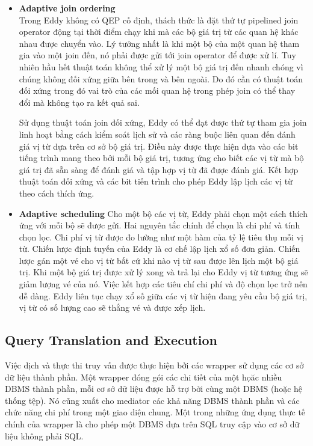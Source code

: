 \documentclass[a4paper]{article}
\begin{document}
\begin{itemize}
    \item \textbf{Adaptive join ordering}\\
    Trong Eddy không có QEP cố định, thách thức là đặt thứ tự pipelined join operator động tại thời điểm chạy khi mà các bộ giá trị từ các quan hệ khác nhau được chuyển vào. Lý tưởng nhất là khi một bộ của một quan hệ tham gia vào một join đến, nó phải được gửi tới join operator để được xử lí. Tuy nhiên hầu hết thuật toán không thể xử lý một bộ giá trị đến nhanh chóng vì chúng không đối xứng giữa bên trong và bên ngoài. Do đó cần có thuật toán đối xứng trong đó vai trò của các mối quan hệ trong phép join có thể thay đổi mà không tạo ra kết quả sai.


    Sử dụng thuật toán join đối xứng, Eddy có thể đạt được thứ tự tham gia join linh hoạt bằng cách kiểm soát lịch sử và các ràng buộc liên quan đến đánh giá vị từ dựa trên cơ sở bộ giá trị. Điều này được thực hiện dựa vào các bit tiếng trình mang theo bởi mỗi bộ giá trị, tương ứng cho biết các vị từ mà bộ giá trị đã sẵn sàng để đánh giá và tập hợp vị từ đã được đánh giá. Kết hợp thuật toán đối xứng và các bit tiến trình cho phép Eddy lập lịch các vị từ theo cách thích ứng.
    \item \textbf{Adaptive scheduling}
    Cho một bộ các vị từ, Eddy phải chọn một cách thích ứng với mỗi bộ sẽ được gửi. Hai nguyên tắc chính để chọn là chi phí và tính chọn lọc. Chi phí vị từ được đo lường như một hàm của tỷ lệ tiêu thụ mỗi vị từ. Chiến lược định tuyến của Eddy là cơ chế lập lịch xổ số đơn giản. Chiến lược gán một vé cho vị từ bất cứ khi nào vị từ sau được lên lịch một bộ giá trị. Khi một bộ giá trị được xử lý xong và trả lại cho Eddy vị từ tương ứng sẽ giảm lượng vé của nó. Việc kết hợp các tiêu chí chi phí và độ chọn lọc trở nên dễ dàng. Eddy liên tục chạy xổ số giữa các
   vị từ hiện đang yêu cầu bộ giá trị, vị từ có số lượng cao sẽ thắng vé và được xếp lịch.
\end{itemize}
\subsection{Query Translation and Execution}
Việc dịch và thực thi truy vấn được thực hiện bởi các wrapper sử dụng các cơ sở dữ liệu thành phần. Một wrapper đóng gói các chi tiết của một họăc nhiều DBMS thành phần, mỗi cơ sở dữ liệu được hỗ trợ bởi cùng một DBMS (hoặc hệ thống tệp). Nó cũng xuất cho mediator các khả năng DBMS thành phần và các chức năng chi phí trong một giao diện chung. Một trong những ứng dụng thực tế chính của wrapper là cho phép một DBMS dựa trên SQL truy cập vào cơ sở dữ liệu không phải SQL.
\end{document}
